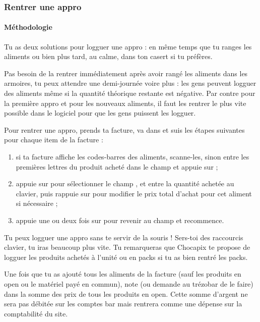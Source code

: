 \documentclass[12pt,french]{article}
\begin{document}
\subsubsection{Rentrer une appro}

\paragraph{Méthodologie} Tu as deux solutions pour logguer une appro : en même temps que tu ranges les aliments ou bien plus tard, au calme, dans ton casert si tu préfères.

Pas besoin de la rentrer immédiatement après avoir rangé les aliments dans les armoires, tu peux attendre une demi-journée voire plus : les gens peuvent logguer des aliments même si la quantité théorique restante est négative. Par contre pour la première appro et pour les nouveaux aliments, il faut les rentrer le plus vite possible dans le logiciel pour que les gens puissent les logguer.

Pour rentrer une appro, prends ta facture, va dans  et suis les étapes suivantes pour chaque item de la facture :
\begin{enumerate}
	\item si ta facture affiche les codes-barres des aliments, scanne-les, sinon entre les premières lettres du produit acheté dans le champ  et appuie sur  ;
	\item appuie sur  pour sélectionner le champ , et entre la quantité achetée au clavier, puis rappuie sur  pour modifier le prix total d'achat pour cet aliment si nécessaire ;
	\item appuie une ou deux fois sur  pour revenir au champ  et recommence.
\end{enumerate}
Tu peux logguer une appro sans te servir de la souris ! Sers-toi des raccourcis clavier, tu iras beaucoup plus vite. Tu remarqueras que Chocapix te propose de logguer les produits achetés à l'unité ou en packs si tu as bien rentré les packs.

Une fois que tu as ajouté tous les aliments de la facture (sauf les produits en open ou le matériel payé en commun), note (ou demande au trézobar de le faire) dans  la somme des prix de tous les produits en open. Cette somme d'argent ne sera pas débitée sur les comptes bar mais rentrera comme une dépense sur la comptabilité du site.
\end{document}
